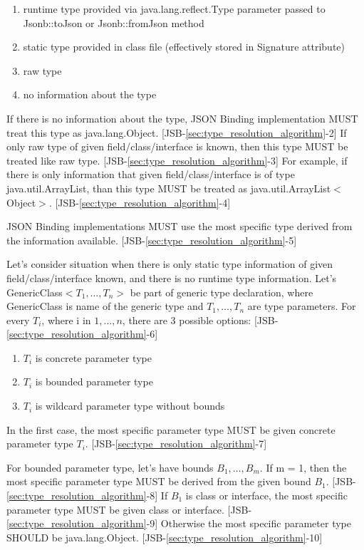 \begin{enumerate}
	\item runtime type provided via java.lang.reflect.Type parameter passed to Jsonb::toJson or Jsonb::fromJson method
	\item static type provided in class file (effectively stored in Signature attribute)
	\item raw type
	\item no information about the type
\end{enumerate}

If there is no information about the type, JSON Binding implementation MUST treat this type as java.lang.Object. [JSB-\ref{sec:type_resolution_algorithm}-2]
If only raw type of given field/class/interface is known, then this type MUST be treated like raw type. [JSB-\ref{sec:type_resolution_algorithm}-3] For example, if there is only information that given field/class/interface is of type java.util.ArrayList, than this type MUST be treated as java.util.ArrayList\(<\)Object\(>\). [JSB-\ref{sec:type_resolution_algorithm}-4]

JSON Binding implementations MUST use the most specific type derived from the information available. [JSB-\ref{sec:type_resolution_algorithm}-5]

Let's consider situation when there is only static type information of given field/class/interface known, and there is no runtime type information. Let's GenericClass\(<T_1,\dotsc,T_n>\) be part of generic type declaration, where GenericClass is name of the generic type and \(T_1,\dotsc,T_n\) are type parameters. For every \(T_i\), where i in \(1,\dotsc,n\), there are 3 possible options: [JSB-\ref{sec:type_resolution_algorithm}-6]

\begin{enumerate}
	\item \(T_i\) is concrete parameter type
	\item \(T_i\) is bounded parameter type
	\item \(T_i\) is wildcard parameter type without bounds
\end{enumerate}

In the first case, the most specific parameter type MUST be given concrete parameter type \(T_i\). [JSB-\ref{sec:type_resolution_algorithm}-7]

For bounded parameter type, let's have bounds \(B_1,\dotsc,B_m\). If m = 1, then the most specific parameter type MUST be derived from the given bound \(B_1\). [JSB-\ref{sec:type_resolution_algorithm}-8] If \(B_1\) is class or interface, the most specific parameter type MUST be given class or interface. [JSB-\ref{sec:type_resolution_algorithm}-9] Otherwise the most specific parameter type SHOULD be java.lang.Object. [JSB-\ref{sec:type_resolution_algorithm}-10]

